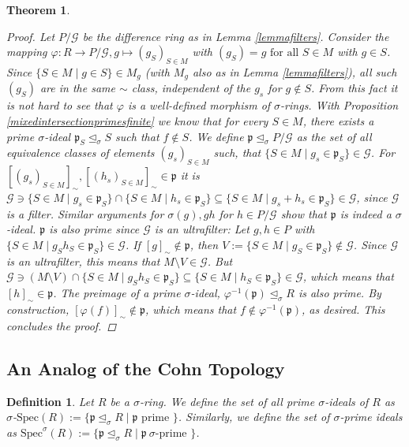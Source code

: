 \documentclass{article}
\def\p{\mathfrak{p}}
\def\s{\sigma}
\def\si{\unlhd_{\sigma}}
\def\Spec{\text{Spec}}
\def\fa{\text{ for all }}
\newenvironment{bew}{\begin{proof}[Proof]}{\end{proof}}
\theoremstyle{plain}
\newtheorem{theorem}[Satz]{Theorem}
\newtheorem{defn}[Satz]{Definition}
\theoremstyle{definition}
\begin{document}
\begin{theorem}
\begin{bew}
Let $P/\mathcal{G}$ be the difference ring as in Lemma \ref{lemmafilters}. Consider the mapping $\varphi: R \rightarrow P/\mathcal{G}, g \mapsto (g_S)_{S \in M}$ with $(g_S) = g \fa S \in M$ with $g \in S$. 
Since $\{ S \in M \mid g \in S \} \in M_g$ (with $M_g$ also as in Lemma \ref{lemmafilters}), all such $(g_S)$ are in the same $\sim$ class, independent of the $g_s$ for $g \notin S$. 
From this fact it is not hard to see that $\varphi$ is a well-defined morphism of $\s$-rings. 
With Proposition \ref{mixedintersectionprimesfinite} we know that for every $S \in M$, there exists a prime $\s$-ideal $\p_S \si S$ such that $f \notin S$. 
We define $\p \si P/\mathcal{G}$ as the set of all equivalence classes of elements $(g_s)_{S \in M}$ such, that $\{ S \in M \mid g_s \in \p_S \} \in \mathcal{G}$. 
For $[(g_s)_{S \in M}]_{\sim}, [(h_s)_{S \in M}]_{\sim} \in \p$ it is $ \mathcal{G} \ni \{ S \in M \mid  g_s \in \p_S \} \cap  \{ S \in M \mid  h_s \in \p_S \} \subseteq \{ S \in M \mid  g_s + h_s \in \p_S \} \in \mathcal{G}$,
since $\mathcal{G}$ is a filter. Similar arguments for $\s(g), gh$ for $h \in P/\mathcal{G}$ show that $\p$ is indeed a $\s$-ideal. $\p$ is also prime since $\mathcal{G}$ is an ultrafilter:
Let $g,h \in P$ with $\{ S \in M \mid g_Sh_S \in \p_S \} \in \mathcal{G}$. If $[g]_\sim \notin \p$, then $V:= \{ S \in M \mid g_S \in \p_S \} \notin \mathcal{G}$. Since $\mathcal{G}$ is an ultrafilter, 
this means that $M \setminus V \in \mathcal{G}$. But $\mathcal{G} \ni (M \setminus V) \cap \{ S \in M \mid g_S h_S \in \p_S \} \subseteq \{ S \in M \mid h_S \in \p_S \} \in \mathcal{G}$, which means that $[h]_\sim \in \p$.
The preimage of a prime $\s$-ideal, $\varphi^{-1}(\p) \si R$ is also prime. By construction, $[\varphi(f)]_\sim \notin \p$, which means that $f \notin \varphi^{-1}(\p)$, as desired. This concludes the proof.

\end{bew}
\end{theorem}

\subsection{An Analog of the Cohn Topology}

\begin{defn}
Let $R$ be a $\s$-ring. We define the set of all prime $\s$-ideals of $R$ as $\s$-$\Spec(R):= \{ \p \si R \mid \p \text{ prime }\}$. Similarly, we define the set of $\s$-prime ideals as $\Spec^\s(R):= \{ \p \si R \mid \p ~ \s\text{-prime }\}$.
\end{defn}
\end{document}
